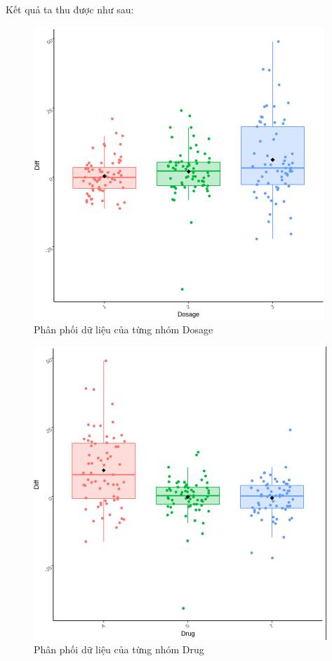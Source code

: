 \begin{itemize}
Kết quả ta thu được như sau:
    \begin{figure}[H]
        \centering
        \includegraphics[width=0.4\linewidth]{part01_figures/4.png}
        \caption{Phân phối dữ liệu của từng nhóm Dosage}
        \label{fig:Phân phối dữ liệu của từng nhóm Dosage}
    \end{figure}
    \begin{figure}[H]
        \centering
        \includegraphics[width=0.4\linewidth]{part01_figures/5.png}
        \caption{Phân phối dữ liệu của từng nhóm Drug}
        \label{fig:Phân phối dữ liệu của từng nhóm Drug}
    \end{figure}


\end{itemize}
